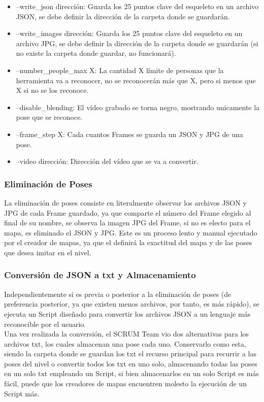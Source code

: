 \begin{itemize}
	\item --write\_json dirección: Guarda los 25 puntos clave del esqueleto en un archivo JSON, se debe definir la dirección de la carpeta donde se guardarán.
	\item --write\_images dirección: Guarda los 25 puntos clave del esqueleto en un archivo JPG, se debe definir la dirección de la carpeta donde se guardarán (si no existe la carpeta donde guardar, no funcionará).
	\item --number\_people\_max X: La cantidad X límite de personas que la herramienta va a reconocer, no se reconocerán más que X, pero si menos que X si no se los reconoce.
	\item --disable\_blending: El vídeo grabado se torna negro, mostrando unicamente la pose que se reconoce.
	\item --frame\_step X: Cada cuantos Frames se guarda un JSON y JPG de una pose.
	\item --video dirección: Dirección del vídeo que se va a convertir.
\end{itemize}

\subsubsection{Eliminación de Poses}

La eliminación de poses consiste en literalmente observar los archivos JSON y JPG de cada Frame guardado, ya que comparte el número del Frame elegido al final de su nombre, se observa la imagen JPG del Frame, si no es electo para el mapa, es eliminado el JSON y JPG. Este es un proceso lento y manual ejecutado por el creador de mapas, ya que el definirá la exactitud del mapa y de las poses que desea imitar en el nivel.

\subsubsection{Conversión de JSON a txt y Almacenamiento}

Independientemente si es previa o posterior a la eliminación de poses (de preferencia posterior, ya que existen menos archivos, por tanto, es más rápido), se ejecuta un Script diseñado para convertir los archivos JSON a un lenguaje más reconocible por el usuario. 
\\
Una vez realizada la conversión, el SCRUM Team vio dos alternativas para los archivos txt, los cuales almacenan una pose cada uno. Conservarlo como esta, siendo la carpeta donde se guardan los txt el recurso principal para recurrir a las poses del nivel o convertir todos los txt en uno solo, almacenando todas las poses en un solo txt empleando un Script, si bien almacenarlos en un solo Script es más fácil, puede que los creadores de mapas encuentren molesto la ejecución de un Script más.

